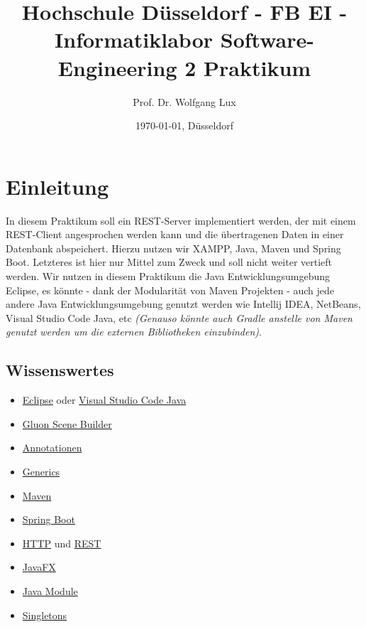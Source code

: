 \documentclass[11pt]{scrartcl}
\title{Hochschule Düsseldorf - FB EI - Informatiklabor \newline Software-Engineering 2 Praktikum}
\author{Prof. Dr. Wolfgang Lux}
\date{\today{}, Düsseldorf}
\begin{document}
\maketitle
\tableofcontents

\newpage
\section{Einleitung}
\label{sec:introduction}

In diesem Praktikum soll ein REST-Server implementiert werden, 
der mit einem REST-Client angesprochen werden kann und die übertragenen Daten in einer
Datenbank abspeichert. Hierzu nutzen wir XAMPP, Java, Maven und Spring Boot.
Letzteres ist hier nur Mittel zum Zweck und soll nicht weiter vertieft werden.
Wir nutzen in diesem Praktikum die Java Entwicklungsumgebung Eclipse, es könnte - dank der Modularität von
Maven Projekten - auch jede andere Java Entwicklungsumgebung genutzt werden
wie Intellij IDEA, NetBeans, Visual Studio Code Java, etc \textit{(Genauso könnte auch Gradle anstelle 
von Maven genutzt werden um die externen Bibliotheken einzubinden)}.


\subsection{Wissenswertes}
\label{sec:wissenswertes}
\begin{itemize}
    \item \href{https://de.wikipedia.org/wiki/Eclipse_(IDE)}{Eclipse} oder 
    \href{https://code.visualstudio.com/docs/languages/java}{Visual Studio Code Java}
    \item \href{https://gluonhq.com/products/scene-builder/}{Gluon Scene Builder}
    \item \href{https://de.wikipedia.org/wiki/Annotation_(Java)}{Annotationen}
    \item \href{https://de.wikipedia.org/wiki/Generische_Programmierung_in_Java}{Generics}
    \item \href{https://de.wikipedia.org/wiki/Apache_Maven}{Maven}
    \item \href{https://spring.io/projects/spring-boot}{Spring Boot}
    \item \href{https://de.wikipedia.org/wiki/Hypertext_Transfer_Protocol}{HTTP} und \href{https://de.wikipedia.org/wiki/Representational_State_Transfer}{REST}
    \item \href{https://openjfx.io/}{JavaFX}
    \item \href{https://openjdk.java.net/projects/jigsaw/quick-start}{Java Module}
    \item \href{https://de.wikibooks.org/wiki/Muster:_Java:_Singleton}{Singletons}
\end{itemize}
\end{document}
